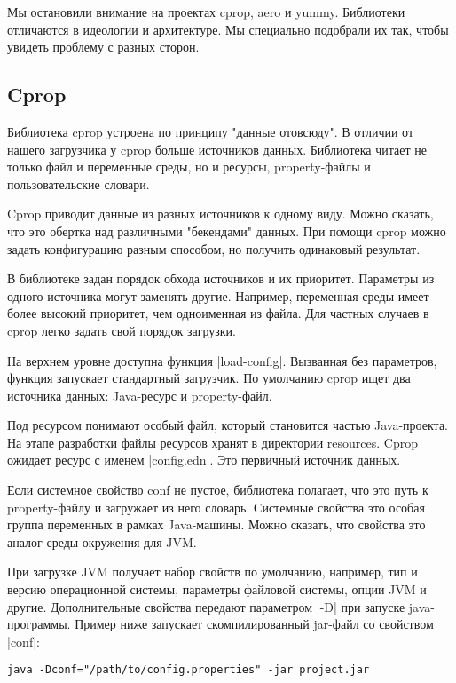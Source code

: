 Мы остановили внимание на проектах cprop, aero и yummy. Библиотеки отличаются в
идеологии и архитектуре. Мы специально подобрали их так, чтобы увидеть проблему
с разных сторон.

\subsection{Cprop}

Библиотека cprop устроена по принципу "данные отовсюду". В отличии от нашего
загрузчика у cprop больше источников данных. Библиотека читает не только файл и
переменные среды, но и ресурсы, property-файлы и пользовательские словари.

Cprop приводит данные из разных источников к одному виду. Можно сказать, что это
обертка над различными "бекендами" данных. При помощи cprop можно задать
конфигурацию разным способом, но получить одинаковый результат.

В библиотеке задан порядок обхода источников и их приоритет. Параметры из одного
источника могут заменять другие. Например, переменная среды имеет более высокий
приоритет, чем одноименная из файла. Для частных случаев в cprop легко задать
свой порядок загрузки.

На верхнем уровне доступна функция \spverb|load-config|. Вызванная без параметров,
функция запускает стандартный загрузчик. По умолчанию cprop ищет два источника
данных: Java-ресурс и property-файл.

Под ресурсом понимают особый файл, который становится частью Java-проекта. На
этапе разработки файлы ресурсов хранят в директории resources. Cprop ожидает
ресурс с именем \spverb|config.edn|. Это первичный источник данных.

Если системное свойство conf не пустое, библиотека полагает, что это путь к
property-файлу и загружает из него словарь. Системные свойства это особая группа
переменных в рамках Java-машины. Можно сказать, что свойства это аналог среды
окружения для JVM.

При загрузке JVM получает набор свойств по умолчанию, например, тип и версию
операционной системы, параметры файловой системы, опции JVM и
другие. Дополнительные свойства передают параметром \spverb|-D| при запуске
java-программы. Пример ниже запускает скомпилированный jar-файл со свойством
\spverb|conf|:

\begin{verbatim}
java -Dconf="/path/to/config.properties" -jar project.jar
\end{verbatim}

